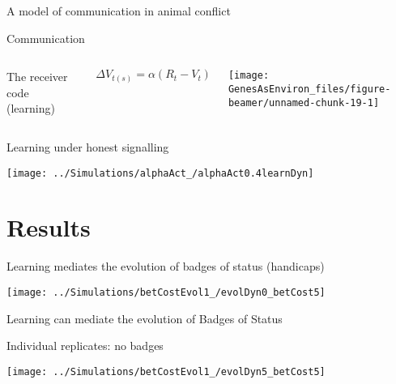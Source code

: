 \documentclass[
  ignorenonframetext,
]{beamer}
\begin{document}
\begin{frame}{A model of communication in animal conflict}
\begin{block}{Communication}
\begin{columns}[T]

The receiver code (learning)

\tiny
\begin{equation*}
  \Delta V_{t(s)}=\alpha (R_t-V_t)
\end{equation*}



\begin{center}\texttt{[image: GenesAsEnviron\_files/figure-beamer/unnamed-chunk-19-1]} \end{center}

\end{columns}

\end{block}

\end{frame}

\begin{frame}{Learning under honest signalling}
\protect\hypertarget{learning-under-honest-signalling}{}

\begin{center}\texttt{[image: ../Simulations/alphaAct\_/alphaAct0.4learnDyn]} \end{center}

\end{frame}

\hypertarget{results}{%
\section{Results}\label{results}}

\begin{frame}{Learning mediates the evolution of badges of status
(handicaps)}
\protect\hypertarget{learning-mediates-the-evolution-of-badges-of-status-handicaps}{}

\begin{center}\texttt{[image: ../Simulations/betCostEvol1\_/evolDyn0\_betCost5]} \end{center}

\end{frame}

\begin{frame}{Learning can mediate the evolution of Badges of Status}
\protect\hypertarget{learning-can-mediate-the-evolution-of-badges-of-status}{}

\begin{block}{Individual replicates: no badges}

\begin{center}\texttt{[image: ../Simulations/betCostEvol1\_/evolDyn5\_betCost5]} \end{center}

\end{block}

\end{frame}
\end{document}
